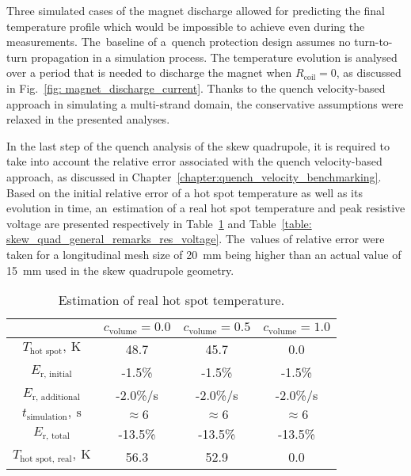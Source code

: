 
Three simulated cases of the magnet discharge allowed for predicting the final temperature profile which would be impossible to achieve even during the measurements. The~baseline of a~quench protection design assumes no turn-to-turn propagation in a simulation process. The temperature evolution is analysed over a period that is needed to discharge the magnet when $R_\text{coil}=0$, as discussed in Fig.~\ref{fig: magnet_discharge_current}. Thanks to the quench velocity-based approach in simulating a multi-strand domain, the conservative assumptions were relaxed in the presented analyses. 

In the last step of the quench analysis of the skew quadrupole, it is required to take into account the relative error associated with the quench velocity-based approach, as discussed in Chapter~\ref{chapter:quench_velocity_benchmarking}. Based on the initial relative error of a hot spot temperature as well as its evolution in time, an~estimation of a real hot spot temperature and peak resistive voltage are presented respectively in Table~\ref{table: skew_quad_general_remarks_hot_spot} and Table~\ref{table: skew_quad_general_remarks_res_voltage}. The~values of relative error were taken for a longitudinal mesh size of 20~mm being higher than an actual value of 15~mm used in the skew quadrupole geometry. 

\begin{table}[H]
    \caption{Estimation of real hot spot temperature.} 
    \vspace{-1.em} 
    \fontsize{10}{10}
    \selectfont 
    \renewcommand{\arraystretch}{1.5}
    \begin{center}
        \begin{tabular}{ | c | c | c | c | }  
        \hline
         & $c_\text{volume}=0.0$ & $c_\text{volume}=0.5$ & $c_\text{volume}=1.0$ \\
        \hline
        $T_\text{hot spot},~\text{K}$ & 48.7 & 45.7 & 0.0 \\
        $E_\text{r, initial}$ & -1.5\% & -1.5\% & -1.5\% \\
        $E_\text{r, additional}$ & -2.0\%/s & -2.0\%/s & -2.0\%/s \\
        $t_\text{simulation},~\text{s}$ & $\approx 6$ & $\approx 6$ & $\approx 6$ \\
        $E_\text{r, total}$ & -13.5\% & -13.5\% & -13.5\% \\
        $T_\text{hot spot, real},~\text{K}$ & 56.3 & 52.9 & 0.0 \\
        \hline 
        \end{tabular}
    \end{center}  
     \label{table: skew_quad_general_remarks_hot_spot} 
\end{table}

